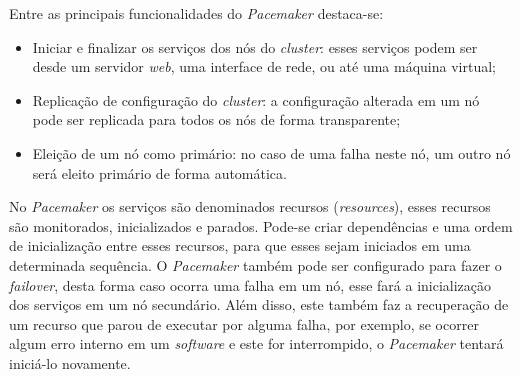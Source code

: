Entre as principais funcionalidades do \textit{Pacemaker} destaca-se:
\begin{itemize}
 \item Iniciar e finalizar os serviços dos nós do \textit{cluster}: esses serviços podem ser desde um servidor \textit{web}, uma interface de 
 rede, ou até uma máquina virtual;
 \item Replicação de configuração do \textit{cluster}: a configuração alterada em um nó pode ser replicada para todos os nós de forma transparente;
 \item Eleição de um nó como primário: no caso de uma falha neste nó, um outro nó será eleito primário de forma automática.
\end{itemize}

No \textit{Pacemaker} os serviços são denominados recursos (\textit{resources}), esses recursos são monitorados, inicializados e parados.
Pode-se criar dependências e uma ordem de inicialização entre esses recursos, para que esses sejam iniciados em uma determinada sequência. O \textit{Pacemaker} 
também pode ser configurado para fazer o \textit{failover}, desta forma caso ocorra uma falha em um nó, esse fará a inicialização dos serviços 
em um nó secundário. Além disso, este também faz a recuperação de um recurso que parou de executar por alguma falha, por exemplo, 
se ocorrer algum erro interno em um \textit{software} e este for interrompido, o \textit{Pacemaker} tentará iniciá-lo novamente.

